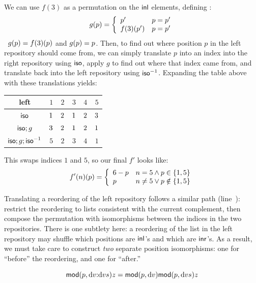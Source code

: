 We can use $f(3)$ as a permutation on the $\mathsf{inl}$ elements, defining%
\ifdissertation:
\[g(p) = \left\{\begin{array}{ll}{p'} & p = {p'} \\
               {f(3)(p')} & p = {p'}\end{array}\right.\]
\else\ $g( p)={f(3)(p)}$ and $g( p)= p$. \fi Then, to find out
where position $p$ in the left repository should come from, we can simply
translate $p$ into an index into the right repository using $\mathsf{iso}$, apply
$g$ to find out where that index came from, and translate back into the left
repository using $\mathsf{iso}^{-1}$. Expanding the table above with these
translations yields:
\begin{center}
\begin{tabular}{@{}c|ccccc@{}}
    left & $1$ & $2$ & $3$ & $4$ & $5$ \\
    \hline
    $\mathsf{iso}$ & $ 1$ & $ 2$ & $ 1$ & $ 2$ & $ 3$ \\
    $\mathsf{iso};g$ & $ 3$ & $ 2$ & $ 1$ & $ 2$ & $ 1$ \\
    $\mathsf{iso};g;\mathsf{iso}^{-1}$ & $5$ & $2$ & $3$ & $4$ & $1$
\end{tabular}
\end{center}
This swaps indices $1$ and $5$, so our final $f'$ looks like:
\[f'(n)(p) = \left\{\begin{array}{ll}
    6-p & n = 5 \land p \in \{1,5\} \\
    p & n \ne 5 \lor p \notin \{1,5\}
    \end{array}\right.\]

Translating a reordering of the left repository follows a similar path (line~):
restrict the reordering to lists consistent with the current complement,
then compose the permutation with isomorphisms between the indices in the
two repositories. There is one subtlety here: a reordering of the list
in the left repository may shuffle which positions are $\mathsf{inl}$'s and which
are $\mathsf{inr}$'s. As a result, we must take care to construct \emph{two}
separate position isomorphisms: one for ``before'' the reordering, and one
for ``after.''


\iffull
\begin{lemma}
    \label{lemma:unfold-mod-once}
    \[\mathsf{mod}(p,\textrm{d} v\mathord{:}\textrm{d} v s)z=\mathsf{mod}(p,\textrm{d} v)\mathsf{mod}(p,\textrm{d} v s)z\]
\end{lemma}

